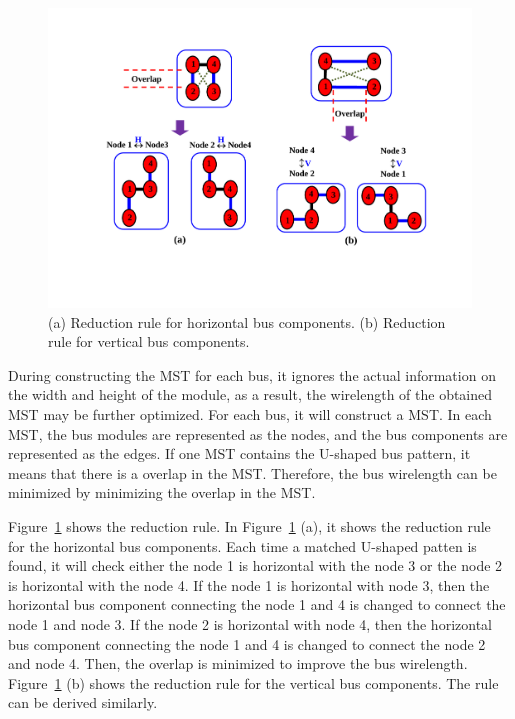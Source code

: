 \begin{figure}[htb]
  \centering
    \includegraphics[width=12cm]{Fig/lemma1.pdf}
     \caption{
      \small
       (a) Reduction rule for horizontal bus components. (b) Reduction rule for vertical bus components.
   }
  \label{fig::lemma1}
\end{figure}

During constructing the MST for each bus, it ignores the actual information
on the width and height of the module, as a result, the wirelength of the obtained MST may
be further optimized.
For each bus, it will construct a MST.
In each MST, the bus modules are represented as the nodes, and the bus components are represented as the edges.
If one MST contains the U-shaped bus pattern, it means that
there is a overlap in the MST. Therefore, the bus wirelength can be minimized by minimizing the overlap in the MST.

Figure~\ref{fig::lemma1} shows the reduction rule.
In Figure~\ref{fig::lemma1} (a), it shows the reduction rule for the horizontal bus components.
Each time a matched U-shaped patten is found, it will check either
the node 1 is horizontal with the node 3 or the node 2 is horizontal with the node 4.
If the node 1 is horizontal with node 3, then the horizontal bus component connecting
the node 1 and 4 is changed to connect the node 1 and node 3.
If the node 2 is horizontal with node 4, then the horizontal bus component connecting
the node 1 and 4 is changed to connect the node 2 and node 4.
Then, the overlap is minimized to improve the bus wirelength.
Figure~\ref{fig::lemma1} (b) shows the reduction rule for the vertical bus components.
The rule can be derived similarly.

